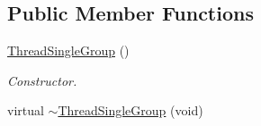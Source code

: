 \subsection*{Public Member Functions}
\begin{DoxyCompactItemize}
\item 
\hypertarget{class_thread_single_group_a9b1944b59a56ecd04fbe8f079c500de9}{
\hyperlink{class_thread_single_group_a9b1944b59a56ecd04fbe8f079c500de9}{ThreadSingleGroup} ()}
\label{class_thread_single_group_a9b1944b59a56ecd04fbe8f079c500de9}

\begin{DoxyCompactList}\small\item\em Constructor. \item\end{DoxyCompactList}\item 
\hypertarget{class_thread_single_group_a6d5bd19c475e76db5d9a591e0540227e}{
virtual \hyperlink{class_thread_single_group_a6d5bd19c475e76db5d9a591e0540227e}{$\sim$ThreadSingleGroup} (void)}
\label{class_thread_single_group_a6d5bd19c475e76db5d9a591e0540227e}


\end{DoxyCompactItemize}
